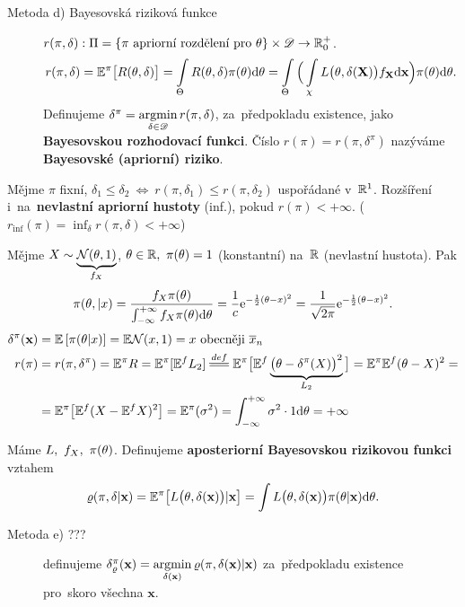 \begin{description}
	\item[Metoda d) Bayesovská riziková funkce] $r(\pi,\delta):\Pi=\{ \pi\text{ apriorní rozdělení pro~}\theta \}\times\mathscr{D}\to\mathbb{R}_0^+$.
	$$ r(\pi,\delta)=\mathbb{E}^\pi\big[ R(\theta,\delta) \big]=\int\limits_{\Theta}R(\theta,\delta)\pi(\theta)\mathrm{d}\theta=\int\limits_{\Theta}\Big( \int\limits_{\chi}L\big(\theta,\delta(\textbf{X})\big)f_\textbf{X}\mathrm{d}\textbf{x} \Big)\pi(\theta)\mathrm{d}\theta.$$
	Definujeme $\delta^\pi=\mathop{\mathrm{argmin}}\limits_{\delta\in\mathscr{D}}r(\pi,\delta)$, za~předpokladu existence, jako \textbf{Bayesovskou rozhodovací funkci}. Číslo $r(\pi)=r(\pi,\delta^\pi)$ nazýváme \textbf{Bayesovské (apriorní) riziko}.  
\end{description}
\begin{remark}
	Mějme $\pi$ fixní, $\delta_1\leq\delta_2~\Leftrightarrow~r(\pi,\delta_1)\leq r(\pi,\delta_2)$ uspořádané v~$\mathbb{R}^1$. Rozšíření i~na~\textbf{nevlastní apriorní hustoty} (inf.), pokud $r(\pi)<+\infty$. ($r_\text{inf}(\pi)=\inf_\delta r(\pi,\delta)<+\infty$)
\end{remark}
\begin{example}
	Mějme $X\sim\underbrace{\mathcal{N}(\theta,1)}_{f_X}$, $\theta\in\mathbb{R},~\pi(\theta)=1$ (konstantní) na~$\mathbb{R}$ (nevlastní hustota). Pak
	$$ \pi(\theta,|x)=\frac{f_X \pi(\theta)}{\int_{-\infty}^{+\infty}f_X \pi(\theta)\mathrm{d}\theta}=\frac{1}{c}\mathrm{e}^{-\frac{1}{2}(\theta-x)^2}=\frac{1}{\sqrt{2\pi}}\mathrm{e}^{-\frac{1}{2}(\theta-x)^2}.$$
	\[\begin{split}
	 \delta^\pi(\textbf{x})&=\EE{\pi(\t|x)}=\E\NN(x,1)=x\text{ obecněji }\overline{x}_n\\
	 r(\pi)&= r(\pi,\delta^\pi)=\E^\pi R=\E^\pi[\E^f L_2]\equal{def}\E^\pi\big[ \E^f\underbrace{\big(\t-\delta^\pi(X) \big)^2}_{L_2} \big]=\E^\pi\E^f(\t-X)^2=\\&=\E^\pi\big[ \E^f(X-\E^fX)^2 \big]=\E^\pi(\sigma^2)=\int_{-\infty}^{+\infty}\sigma^2\cdot 1\d\t=+\infty
	\end{split}
	\]
\end{example}
\begin{define}
	Máme $L,~f_X,~\pi(\theta)$. Definujeme \textbf{aposteriorní Bayesovskou rizikovou funkci} vztahem
	$$ \varrho(\pi,\delta|\textbf{x})=\mathbb{E}^\pi\big[ L\big(\theta,\delta(\textbf{x})\big)|\textbf{x} \big]=\int L\big(\theta,\delta(\textbf{x})\big)\pi(\theta|\textbf{x})\mathrm{d}\theta.$$ 
\end{define}

\begin{description}
	\item[Metoda e) ???] definujeme $\delta_\varrho^\pi(\textbf{x})=\mathop{\mathrm{argmin}}\limits_{\delta(\textbf{x})}\varrho(\pi,\delta(\textbf{x})|\textbf{x})$ za~předpokladu existence pro~skoro všechna $\textbf{x}$.
\end{description}

